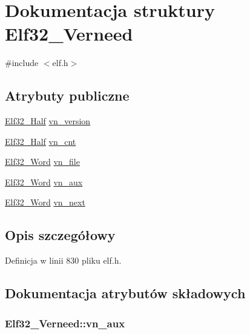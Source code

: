 \hypertarget{struct_elf32___verneed}{\section{Dokumentacja struktury Elf32\-\_\-\-Verneed}
\label{struct_elf32___verneed}
}


{\ttfamily \#include $<$elf.\-h$>$}

\subsection*{Atrybuty publiczne}
\begin{DoxyCompactItemize}
\item 
\hyperlink{elf_8h_a2ff0787d7d1bae0f251192806a2974ca}{Elf32\-\_\-\-Half} \hyperlink{struct_elf32___verneed_ae87cf6c64587fcf3cd80ba2f6aa6b1bb}{vn\-\_\-version}
\item 
\hyperlink{elf_8h_a2ff0787d7d1bae0f251192806a2974ca}{Elf32\-\_\-\-Half} \hyperlink{struct_elf32___verneed_a8c8c56b63ee1f38cf5568fa7bd5b4f73}{vn\-\_\-cnt}
\item 
\hyperlink{elf_8h_af5924ece606c732e86f8263a19408e45}{Elf32\-\_\-\-Word} \hyperlink{struct_elf32___verneed_a71c12598274c795cca809b99462e062a}{vn\-\_\-file}
\item 
\hyperlink{elf_8h_af5924ece606c732e86f8263a19408e45}{Elf32\-\_\-\-Word} \hyperlink{struct_elf32___verneed_a0db7ff11ee775f27ebb1e10a6affabb8}{vn\-\_\-aux}
\item 
\hyperlink{elf_8h_af5924ece606c732e86f8263a19408e45}{Elf32\-\_\-\-Word} \hyperlink{struct_elf32___verneed_ae3819b6239b81ed5c8ce4f8710176870}{vn\-\_\-next}
\end{DoxyCompactItemize}


\subsection{Opis szczegółowy}


Definicja w linii 830 pliku elf.\-h.



\subsection{Dokumentacja atrybutów składowych}
\hypertarget{struct_elf32___verneed_a0db7ff11ee775f27ebb1e10a6affabb8}{
\subsubsection[{vn\-\_\-aux}]{ Elf32\-\_\-\-Verneed\-::vn\-\_\-aux}}\label{struct_elf32___verneed_a0db7ff11ee775f27ebb1e10a6affabb8}


